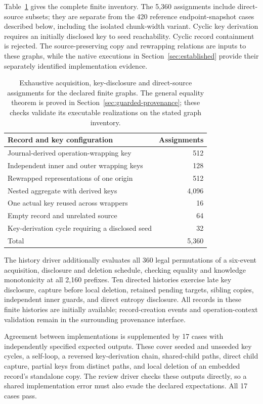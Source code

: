 Table~\ref{tab:guarded-checks} gives the complete finite inventory. The 5,360
assignments include direct-source subsets; they are separate from the 420
reference endpoint-snapshot cases described below, including the isolated
chunk-width variant. Cyclic key derivation requires
an initially disclosed key to seed reachability. Cyclic record containment is
rejected. The source-preserving copy and rewrapping relations are inputs to
these graphs, while the native executions in Section~\ref{sec:established}
provide their separately identified implementation evidence.

\begin{table}[t]
\centering
\small
\begin{tabularx}{\linewidth}{@{}Xr@{}}
\toprule
Record and key configuration & Assignments\\
\midrule
Journal-derived operation-wrapping key & 512\\
Independent inner and outer wrapping keys & 128\\
Rewrapped representations of one origin & 512\\
Nested aggregate with derived keys & 4,096\\
One actual key reused across wrappers & 16\\
Empty record and unrelated source & 64\\
Key-derivation cycle requiring a disclosed seed & 32\\
\midrule
Total & 5,360\\
\bottomrule
\end{tabularx}
\caption{Exhaustive acquisition, key-disclosure and direct-source assignments
for the declared finite graphs. The general equality theorem is proved in
Section~\ref{sec:guarded-provenance}; these checks validate its executable
realizations on the stated graph inventory.}
\label{tab:guarded-checks}
\end{table}

The history driver additionally evaluates all 360 legal permutations of a
six-event acquisition, disclosure and deletion schedule, checking equality
and knowledge monotonicity at all 2,160 prefixes. Ten directed histories
exercise late key disclosure, capture before local deletion, retained pending
targets, sibling copies, independent inner guards, and direct entropy
disclosure. All records in these finite histories are initially available;
record-creation events and operation-context validation remain in the
surrounding provenance interface.

Agreement between implementations is supplemented by 17 cases with
independently specified expected outputs. These cover seeded and unseeded
key cycles, a self-loop, a reversed key-derivation chain, shared-child paths,
direct child capture, partial keys from distinct paths, and local deletion
of an embedded record's standalone copy. The review driver checks these
outputs directly, so a shared implementation error must also evade the
declared expectations. All 17 cases pass.

